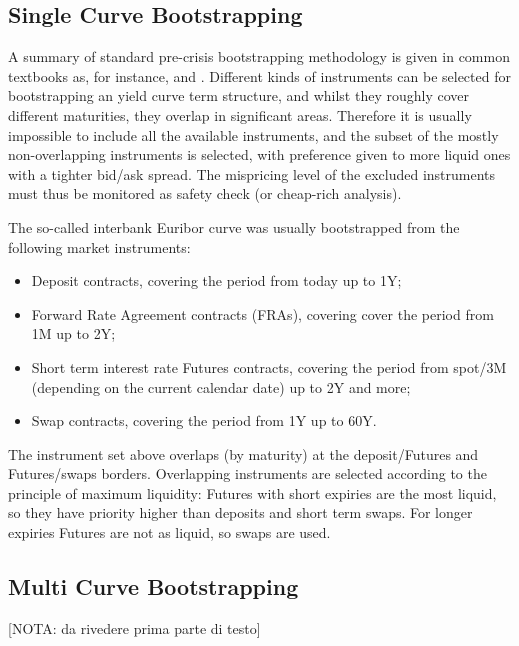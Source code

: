 \documentclass[11pt,reqno]{amsart}
\begin{document}
\subsection{Single Curve Bootstrapping}
A summary of standard pre-crisis bootstrapping methodology is given in common textbooks as, for instance, \cite{Hul08} and \cite{Reb1998}. 
Different kinds of instruments can be selected for bootstrapping an yield curve term structure, and whilst they roughly cover different maturities, they overlap in significant areas. Therefore it is usually impossible to include all the available instruments, and the subset of the mostly non-overlapping instruments is selected, with preference given to more liquid ones with a tighter bid/ask spread. The mispricing level of the excluded instruments must thus be monitored as safety check (or cheap-rich analysis).
\par
The so-called interbank Euribor curve was usually bootstrapped from the following market instruments:
\begin{itemize}
\item Deposit contracts, covering the period from today up to 1Y;
\item Forward Rate Agreement contracts (FRAs), covering cover the period from 1M up to 2Y;
\item Short term interest rate Futures contracts, covering the period from spot/3M (depending on the current calendar date) up to 2Y and more;
\item Swap contracts, covering the period from 1Y up to 60Y.
\end{itemize}
The instrument set above overlaps (by maturity) at the deposit/Futures and Futures/swaps borders. Overlapping instruments are selected according to the principle of maximum liquidity: Futures with short expiries are the most liquid, so they have priority higher than deposits and short term swaps. For longer expiries Futures are not as liquid, so swaps are used.

\subsection{Multi Curve Bootstrapping}
[NOTA: da rivedere prima parte di testo]
\end{document}
